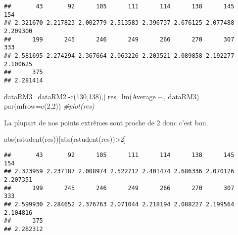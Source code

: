 \documentclass[
]{article}
\newenvironment{Shaded}{\begin{snugshade}}{\end{snugshade}}
\newcommand{\AttributeTok}[1]{\textcolor[rgb]{0.77,0.63,0.00}{#1}}
\newcommand{\CommentTok}[1]{\textcolor[rgb]{0.56,0.35,0.01}{\textit{#1}}}
\newcommand{\DecValTok}[1]{\textcolor[rgb]{0.00,0.00,0.81}{#1}}
\newcommand{\FunctionTok}[1]{\textcolor[rgb]{0.00,0.00,0.00}{#1}}
\newcommand{\NormalTok}[1]{#1}
\newcommand{\OtherTok}[1]{\textcolor[rgb]{0.56,0.35,0.01}{#1}}
\newcommand{\SpecialCharTok}[1]{\textcolor[rgb]{0.00,0.00,0.00}{#1}}
\begin{document}
\begin{verbatim}
##       43       92      105      111      114      138      145      154 
## 2.321670 2.217823 2.002779 2.513583 2.396737 2.676125 2.077488 2.209300 
##      199      245      246      249      266      270      307      333 
## 2.581695 2.274294 2.367664 2.063226 2.203521 2.089858 2.192277 2.100625 
##      375 
## 2.281414
\end{verbatim}

\begin{Shaded}
\begin{Highlighting}[]
\NormalTok{dataRM3}\OtherTok{=}\NormalTok{dataRM2[}\SpecialCharTok{{-}}\FunctionTok{c}\NormalTok{(}\DecValTok{130}\NormalTok{,}\DecValTok{138}\NormalTok{),]}
\NormalTok{res}\OtherTok{=}\FunctionTok{lm}\NormalTok{(Average }\SpecialCharTok{\textasciitilde{}}\NormalTok{., dataRM3)}
\FunctionTok{par}\NormalTok{(}\AttributeTok{mfrow=}\FunctionTok{c}\NormalTok{(}\DecValTok{2}\NormalTok{,}\DecValTok{2}\NormalTok{))}
\CommentTok{\#plot(res)}
\end{Highlighting}
\end{Shaded}

La plupart de nos points extrêmes sont proche de 2 donc c'est bon.

\begin{Shaded}
\begin{Highlighting}[]
\FunctionTok{abs}\NormalTok{(}\FunctionTok{rstudent}\NormalTok{(res))[}\FunctionTok{abs}\NormalTok{(}\FunctionTok{rstudent}\NormalTok{(res))}\SpecialCharTok{\textgreater{}}\DecValTok{2}\NormalTok{]}
\end{Highlighting}
\end{Shaded}

\begin{verbatim}
##       43       92      105      111      114      138      145      154 
## 2.323959 2.237187 2.008974 2.522712 2.401474 2.686336 2.070126 2.207351 
##      199      245      246      249      266      270      307      333 
## 2.599930 2.284652 2.376763 2.071044 2.218194 2.088227 2.199564 2.104816 
##      375 
## 2.282312
\end{verbatim}

\begin{Shaded}
\end{Shaded}
\end{document}
